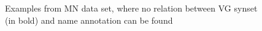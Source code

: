\begin{figure}
\begin{minipage}[b]{0.5\linewidth}
{\begin{tabular}{cp{4cm}p{4cm}p{4cm}}
\end{tabular}

}
\end{minipage}

 \caption{\label{fig:ex}Examples from MN data set, where no relation between VG synset (in bold) and name annotation can be found}
\end{figure}


